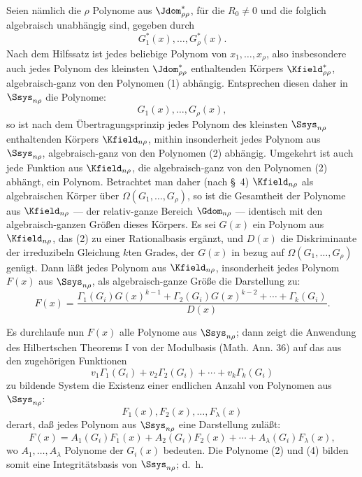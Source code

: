 \documentclass[11pt]{article}
\begin{document}
Seien nämlich die $\rho$ Polynome aus $\Jdom^*_{\rho\rho}$, für die $R_0\ne0$ und die folglich algebraisch unabhängig sind, gegeben durch
\begin{equation}
  G_1^*(x),\ldots,G_\rho^*(x).
\tag{1}
\end{equation}
Nach dem Hilfssatz ist jedes beliebige Polynom von $x_1,
\ldots,x_\rho$, also insbesondere auch jedes Polynom des kleinsten $\Jdom^*_{\rho\rho}$ enthaltenden Körpers $\Kfield^*_{\rho\rho}$, algebraisch-ganz von den Polynomen (1) abhängig. Entsprechen diesen daher in $\Ssys_{n\rho}$ die Polynome:
\begin{equation}
  G_1(x),\ldots,G_\rho(x),
\tag{2}
\end{equation}
so ist nach dem Übertragungsprinzip jedes Polynom des kleinsten $\Ssys_{n\rho}$ enthaltenden Körpers $\Kfield_{n\rho}$, mithin insonderheit jedes Polynom aus $\Ssys_{n\rho}$, algebraisch-ganz von den Polynomen (2) abhängig. Umgekehrt ist auch jede Funktion aus $\Kfield_{n\rho}$, die algebraisch-ganz von den Polynomen (2) abhängt, ein Polynom. Betrachtet man daher (nach \S\ 4) $\Kfield_{n\rho}$ als algebraischen Körper über $\Omega(G_1,
\ldots,G_\rho)$, so ist die Gesamtheit der Polynome aus $\Kfield_{n\rho}$ --- der relativ-ganze Bereich $\Gdom_{n\rho}$ --- identisch mit den algebraisch-ganzen Größen dieses Körpers. Es sei $G(x)$ ein Polynom aus $\Kfield_{n\rho}$, das (2) zu einer Rationalbasis ergänzt, und $D(x)$ die Diskriminante der irreduzibeln Gleichung $k$ten Grades, der $G(x)$ in bezug auf $\Omega(G_1,
\ldots,G_\rho)$ genügt. Dann läßt jedes Polynom aus $\Kfield_{n\rho}$, insonderheit jedes Polynom $F(x)$ aus $\Ssys_{n\rho}$, als algebraisch-ganze Größe die Darstellung zu:
\begin{equation}
  F(x)=\frac{\Gamma_1(G_i)G(x)^{k-1}+\Gamma_2(G_i)G(x)^{k-2}+\cdots+\Gamma_k(G_i)}{D(x)}.
\tag{3}
\end{equation}

Es durchlaufe nun $F(x)$ alle Polynome aus $\Ssys_{n\rho}$; dann zeigt die Anwendung des Hilbertschen Theorems I von der Modulbasis (Math. Ann. 36) auf das aus den zugehörigen Funktionen
\[
  v_1\Gamma_1(G_i)+v_2\Gamma_2(G_i)+\cdots+v_k\Gamma_k(G_i)
\]
zu bildende System die Existenz einer endlichen Anzahl von Polynomen aus $\Ssys_{n\rho}$:
\begin{equation}
  F_1(x),F_2(x),\ldots,F_\lambda(x)
\tag{4}
\end{equation}
derart, daß jedes Polynom aus $\Ssys_{n\rho}$ eine Darstellung zuläßt:
\begin{equation}
  F(x)=A_1(G_i)F_1(x)+A_2(G_i)F_2(x)+\cdots+A_\lambda(G_i)F_\lambda(x),
\tag{5}
\end{equation}
wo $A_1,
\ldots,A_\lambda$ Polynome der $G_i(x)$ bedeuten. Die Polynome (2) und (4) bilden somit eine Integritätsbasis von $\Ssys_{n\rho}$; d.~h.
\end{document}

